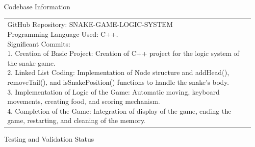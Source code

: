 \documentclass[12pt,a4paper]{article}
\newcommand{\sectiontitle}[1]{%
    {\color{GEUBlue}
    \fontsize{18}{22}\selectfont #1}
}
\newcommand{\answerbox}[2]{%
    \begin{tabularx}{\textwidth}{
        |>{\raggedright\arraybackslash}X|}
        \hline
        \parbox[t][#1][t]{\dimexpr\linewidth-12pt\relax}{
            \vspace{5pt}
            \fontsize{11}{13}\selectfont #2
        }\\
        \hline
    \end{tabularx}
}
\begin{document}
\newpage


\vspace*{0.20cm}

\sectiontitle{Codebase Information}

\vspace{0.05cm}

\vspace{0.20cm}

\answerbox{7.70cm}{GitHub Repository: SNAKE-GAME-LOGIC-SYSTEM\\
Programming Language Used: C++.\\

Significant Commits:\\

1. Creation of Basic Project: Creation of C++ project for the logic system of the snake game.\\

2. Linked List Coding: Implementation of Node structure and addHead(), removeTail(), and isSnakePosition() functions to handle the snake’s body.\\

3. Implementation of Logic of the Game: Automatic moving, keyboard movements, creating food, and scoring mechanism.\\

4. Completion of the Game: Integration of display of the game, ending the game, restarting, and cleaning of the memory.}

\vspace{0.65cm}

\sectiontitle{Testing and Validation Status}

\vspace{0.05cm}

\vspace{0.30cm}
\end{document}
